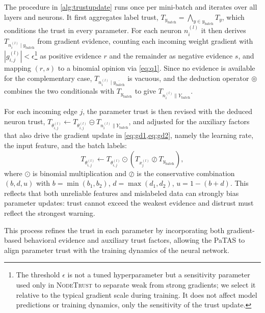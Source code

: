 The procedure in \cref{alg:trustupdate} runs once per mini-batch and iterates over all layers and neurons. It first aggregates label trust, \(T_{y_\text{batch}} = \bigwedge_{y \in y_\text{batch}} T_y\), which conditions the trust in every parameter. For each neuron \(n_i^{(l)}\) it then derives \( T_{n_{i}^{(l)} \mid y_\text{batch}} \) from gradient evidence, counting each incoming weight gradient with \( |g^{(l)}_{i,j}| < \epsilon\)\footnote{The threshold $\epsilon$ is not a tuned hyperparameter but a sensitivity parameter used only in \textsc{NodeTrust} to separate weak from strong gradients; we select it relative to the typical gradient scale during training. It does not affect model predictions or training dynamics, only the sensitivity of the trust update.} as positive evidence \(r\) and the remainder as negative evidence \(s\), and mapping \((r,s)\) to a binomial opinion via \cref{eq:q1}. Since no evidence is available for the complementary case, \( T_{n_{i}^{(l)} \mid \overline{y_\text{batch}}} \) is vacuous, and the deduction operator \( \circledcirc \) combines the two conditionals with \( T_{y_\text{batch}} \) to give \( T_{n_{i}^{(l)} \parallel Y_\text{batch}} \).

For each incoming edge \(j\), the parameter trust is then revised with the deduced neuron trust, \(T_{\theta_{i,j}^{(l)}} \leftarrow T_{\theta_{i,j}^{(l)}} \circleddash T_{n_{i}^{(l)} \parallel Y_\text{batch}}\), and adjusted for the auxiliary factors that also drive the gradient update in \cref{eq:gd1,eq:gd2}, namely the learning rate, the input feature, and the batch labels:
\begin{equation}
    T_{\theta_{i,j}^{(l)}} \longleftarrow T_{\theta_{i,j}^{(l)}} \odot (T_{x_j^{(l)}} \oslash T_{y_\text{batch}}),
\end{equation}
where $\odot$ is binomial multiplication and $\oslash$ is the conservative combination \((b,d,u)\) with \(b = \min(b_1,b_2)\), \(d = \max(d_1,d_2)\), \(u = 1-(b+d)\). This reflects that both unreliable features and mislabeled data can strongly bias parameter updates: trust cannot exceed the weakest evidence and distrust must reflect the strongest warning.

This process refines the trust in each parameter by incorporating both gradient-based behavioral evidence and auxiliary trust factors, allowing the PaTAS to align parameter trust with the training dynamics of the neural network. 

